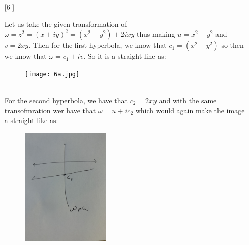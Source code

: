 \documentclass{article}
\theoremstyle{definition}
\begin{document}
\begin{enumerate}
    \item [[\phantom{-}6]]
    
    Let us take the given transformation of $\omega = z^2 = (x + iy)^2 = (x^2 - y^2) + 2ixy$ thus making $u = x^2 - y^2$ and $v = 2xy$. Then for the first hyperbola, we know that $c_1 = (x^2 - y^2)$ so then we know that $\omega = c_1 + iv$. So it is a straight line as:
    \begin{figure}[h]
            \centering
            \texttt{[image: 6a.jpg]}
    \end{figure}
    \\
    For the second hyperbola, we have that $c_2 = 2xy$ and with the same transofmration wer have that $\omega = u + ic_2$ which would again make the image a straight like as: 
    \begin{figure}[h]
            \centering
            \includegraphics[width=0.4\textwidth]{6b.jpg}
    \end{figure}
    
\end{enumerate}
\end{document}
